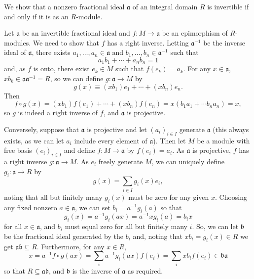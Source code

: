 \documentclass[12pt]{article}
\begin{document}

We show that a nonzero fractional ideal $\mathfrak{a}$ of an integral domain $R$ is invertible if and only if it is  as an $R$-module.

Let $\mathfrak{a}$ be an invertible fractional ideal and $f\colon M\rightarrow \mathfrak{a}$ be an epimorphism of $R$-modules. We need to show that $f$ has a right inverse.
Letting $\mathfrak{a}^{-1}$ be the inverse ideal of $\mathfrak{a}$, there exists $a_1,\ldots,a_n\in\mathfrak{a}$ and $b_1,\ldots,b_n\in\mathfrak{a}^{-1}$ such that
\begin{equation*}
a_1b_1+\cdots+a_nb_n=1
\end{equation*}
and, as $f$ is onto, there exist $e_k\in M$ such that $f(e_k)=a_k$. For any $x\in\mathfrak{a}$, $xb_k\in\mathfrak{a}\mathfrak{a}^{-1}=R$, so we can define $g\colon\mathfrak{a}\rightarrow M$ by
\begin{equation*}
g(x)\equiv (xb_1)e_1+\cdots+(xb_n)e_n.
\end{equation*}
Then
\begin{equation*}
f\circ g(x)= (xb_1)f(e_1)+\cdots+(xb_n)f(e_n)=x(b_1a_1+\cdots b_na_n)=x,
\end{equation*}
so $g$ is indeed a right inverse of $f$, and $\mathfrak{a}$ is projective.

Conversely, suppose that $\mathfrak{a}$ is projective and let $(a_i)_{i\in I}$ generate $\mathfrak{a}$ (this always exists, as we can let $a_i$ include every element of $\mathfrak{a}$). Then let $M$ be a module with free basis $(e_i)_{i\in I}$ and define $f\colon M\rightarrow\mathfrak{a}$ by $f(e_i)=a_i$. As $\mathfrak{a}$ is projective, $f$ has a right inverse $g\colon\mathfrak{a}\rightarrow M$. As $e_i$ freely generate $M$, we can uniquely define $g_i\colon\mathfrak{a}\rightarrow R$ by
\begin{equation*}
g(x)=\sum_{i\in I} g_i(x)e_i,
\end{equation*}
noting that all but finitely many $g_i(x)$ must be zero for any given $x$. Choosing any fixed nonzero $a\in\mathfrak{a}$, we can set $b_i=a^{-1}g_i(a)$ so that
\begin{equation*}
g_i(x)=a^{-1}g_i(ax)=a^{-1}xg_i(a)=b_ix
\end{equation*}
for all $x\in\mathfrak{a}$, and $b_i$ must equal zero for all but finitely many $i$. So, we can let $\mathfrak{b}$ be the fractional ideal generated by the $b_i$ and, noting that $xb_i=g_i(x)\in R$ we get $\mathfrak{a}\mathfrak{b}\subseteq R$. Furthermore, for any $x\in R$,
\begin{equation*}
x=a^{-1}f\circ g(ax)=\sum_ia^{-1}g_i(ax)f(e_i)=\sum_i xb_if(e_i)\in\mathfrak{b}\mathfrak{a}
\end{equation*}
so that $R\subseteq\mathfrak{a}\mathfrak{b}$, and $\mathfrak{b}$ is the inverse of $\mathfrak{a}$ as required.

\end{document}
